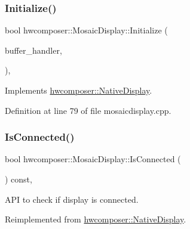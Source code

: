 \subsubsection{\texorpdfstring{Initialize()}{Initialize()}}
{\footnotesize\ttfamily bool hwcomposer\+::\+Mosaic\+Display\+::\+Initialize (\begin{DoxyParamCaption}\item[{\mbox{\hyperlink{classhwcomposer_1_1NativeBufferHandler}{Native\+Buffer\+Handler}} $\ast$}]{buffer\+\_\+handler,  }\item[{\mbox{\hyperlink{classhwcomposer_1_1FrameBufferManager}{Frame\+Buffer\+Manager}} $\ast$}]{ }\end{DoxyParamCaption})\hspace{0.3cm}{\ttfamily [override]}, {\ttfamily [virtual]}}



Implements \mbox{\hyperlink{classhwcomposer_1_1NativeDisplay_a008eb015dda9b4ead93186b4897c2e3c}{hwcomposer\+::\+Native\+Display}}.



Definition at line 79 of file mosaicdisplay.\+cpp.


\begin{DoxyCode}{0}
\end{DoxyCode}
\mbox{\label{classhwcomposer_1_1MosaicDisplay_a837d28f710438d462fd88b85721528b0}} 
\subsubsection{\texorpdfstring{Is\+Connected()}{IsConnected()}}
{\footnotesize\ttfamily bool hwcomposer\+::\+Mosaic\+Display\+::\+Is\+Connected (\begin{DoxyParamCaption}{ }\end{DoxyParamCaption}) const\hspace{0.3cm}{\ttfamily [override]}, {\ttfamily [virtual]}}

A\+PI to check if display is connected. 

Reimplemented from \mbox{\hyperlink{classhwcomposer_1_1NativeDisplay_af22694b3396866fd4f003755f4951b18}{hwcomposer\+::\+Native\+Display}}.



